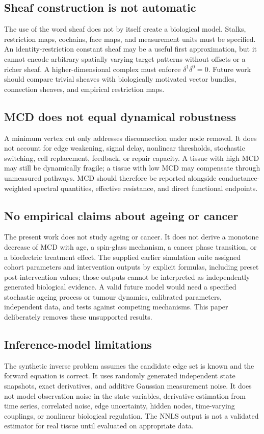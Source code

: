\documentclass[12pt,a4paper]{article}
\begin{document}
\subsection{Sheaf construction is not automatic}
The use of the word sheaf does not by itself create a biological model. Stalks, restriction maps, cochains, face maps, and measurement units must be specified. An identity-restriction constant sheaf may be a useful first approximation, but it cannot encode arbitrary spatially varying target patterns without offsets or a richer sheaf. A higher-dimensional complex must enforce \(\delta^1\delta^0=0\). Future work should compare trivial sheaves with biologically motivated vector bundles, connection sheaves, and empirical restriction maps.

\subsection{MCD does not equal dynamical robustness}
A minimum vertex cut only addresses disconnection under node removal. It does not account for edge weakening, signal delay, nonlinear thresholds, stochastic switching, cell replacement, feedback, or repair capacity. A tissue with high MCD may still be dynamically fragile; a tissue with low MCD may compensate through unmeasured pathways. MCD should therefore be reported alongside conductance-weighted spectral quantities, effective resistance, and direct functional endpoints.

\subsection{No empirical claims about ageing or cancer}
The present work does not study ageing or cancer. It does not derive a monotone decrease of MCD with age, a spin-glass mechanism, a cancer phase transition, or a bioelectric treatment effect. The supplied earlier simulation suite assigned cohort parameters and intervention outputs by explicit formulas, including preset post-intervention values; those outputs cannot be interpreted as independently generated biological evidence. A valid future model would need a specified stochastic ageing process or tumour dynamics, calibrated parameters, independent data, and tests against competing mechanisms. This paper deliberately removes these unsupported results.

\subsection{Inference-model limitations}
The synthetic inverse problem assumes the candidate edge set is known and the forward equation is correct. It uses randomly generated independent state snapshots, exact derivatives, and additive Gaussian measurement noise. It does not model observation noise in the state variables, derivative estimation from time series, correlated noise, edge uncertainty, hidden nodes, time-varying couplings, or nonlinear biological regulation. The NNLS output is not a validated estimator for real tissue until evaluated on appropriate data.
\end{document}
